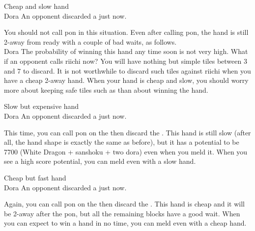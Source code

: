 \begin{itembox}[r]{Cheap and slow hand}
\bp
{}\bai\bai~~\\
\hspace{295pt}\footnotesize{\jap Dora}
\ep
\vspace{-20pt}An opponent discarded a {\large\bai} just now.
\end{itembox}
You should not call {\jap pon} in this situation. Even after calling {\jap pon}, the hand is still 2-away from ready with a couple of bad waits, as follows.
\bp
{}~\rbai\bai\bai~~\\
\hspace{308pt}\footnotesize{\jap Dora}
\ep
The probability of winning this hand any time soon is not very high. What if an opponent calls {\jap riichi} now? You will have nothing but simple tiles between 3 and 7 to discard. It is not worthwhile to discard such tiles against {\jap riichi} when you have a cheap 2-away hand. When your hand is cheap and slow, you should worry more about keeping safe tiles such as {\large\bai} than about winning the hand.

\vfill
\begin{itembox}[r]{Slow but expensive hand}
\bp
{}\bai\bai~~\\
\hspace{295pt}\footnotesize{\jap Dora}
\ep
\vspace{-20pt}An opponent discarded a {\large\bai} just now.
\end{itembox}
This time, you can call {\jap pon} on the {\large\bai} then discard the {\large{}}. This hand is still slow (after all, the hand shape is exactly the same as before), but it has a potential to be 7700 (White Dragon + {\jap sanshoku} + two {\jap dora}) even when you meld it. When you see a high score potential, you can meld even with a slow hand. 

\bigskip
\begin{itembox}[r]{Cheap but fast hand}
\bp
{}\bai\bai~~\\
\hspace{295pt}\footnotesize{\jap Dora}
\ep
\vspace{-20pt}An opponent discarded a {\large\bai} just now.
\end{itembox}
Again, you can call {\jap pon} on the {\large\bai} then discard the {\large{}}. This hand is cheap and it will be 2-away after the {\jap pon}, but all the remaining blocks have a good wait. When you can expect to win a hand in no time, you can meld even with a cheap hand. 

